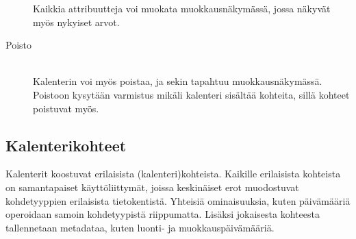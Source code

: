 \documentclass[a4paper,12pt]{report}
\begin{document}
\begin{description}
      Kaikkia attribuutteja voi muokata muokkaus\-näkymässä, jossa näkyvät myös
      nykyiset arvot.
   \item[Poisto] \hfill\\
      Kalenterin voi myös poistaa, ja sekin tapahtuu muokkausnäkymässä.
      Poistoon kysytään varmistus mikäli kalenteri sisältää kohteita, sillä
      kohteet poistuvat myös.
\end{description}

\subsection{Kalenterikohteet}
Kalenterit koostuvat erilaisista (kalenteri)kohteista.  Kaikille erilaisista
kohteista on samantapaiset käyttöliittymät, joissa keskinäiset erot muodostuvat
kohdetyyppien erilaisista tietokentistä.  Yhteisiä ominaisuuksia, kuten
päivämääriä operoidaan samoin kohdetyypistä riippumatta.  Lisäksi jokaisesta
kohteesta tallennetaan metadataa, kuten luonti- ja muokkauspäivämääriä.
\end{document}
